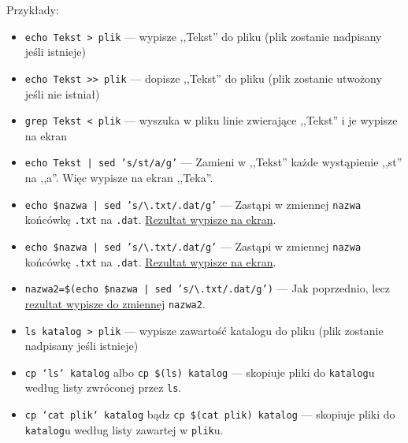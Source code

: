 \documentclass[polish]{instrukcja}
\begin{document}
Przykłady:
\begin{itemize}
\item {\tt echo Tekst {\blue > plik}} --- wypisze ,,Tekst'' do {\blue plik}u ({\blue plik} zostanie nadpisany jeśli istnieje)
\item {\tt echo Tekst {\blue >> plik}} --- dopisze ,,Tekst'' do {\blue plik}u ({\blue plik} zostanie utwożony jeśli nie istniał)
\item {\tt grep Tekst {\blue < plik}} --- wyszuka w {\blue plik}u linie zwierające {\green ,,Tekst''} i je wypisze na ekran
\item {\tt echo Tekst {\blue |} sed 's/st/a/g'} --- Zamieni w ,,Tekst'' każde wystąpienie ,,st'' na ,,a''. Więc wypisze na ekran ,,Teka''.
\item {\tt echo \$nazwa {\blue |} sed 's/\textbackslash{}.txt/.dat/g'} --- Zastąpi w zmiennej {\tt nazwa} końcówkę {\tt .txt} na {\tt .dat}. \uline{Rezultat wypisze na ekran}.
\item {\tt echo \$nazwa {\blue |} sed 's/\textbackslash{}.txt/.dat/g'} --- Zastąpi w zmiennej {\tt nazwa} końcówkę {\tt .txt} na {\tt .dat}. \uline{Rezultat wypisze na ekran}.
\item {\tt nazwa2={\blue \$(}echo \$nazwa {\blue |} sed 's/\textbackslash{}.txt/.dat/g'{\blue )}} --- Jak poprzednio, lecz \uline{rezultat wypisze do zmiennej} {\tt nazwa2}.
\item {\tt ls katalog {\blue > plik}} --- wypisze zawartość {\green katalog}u do {\blue plik}u ({\blue plik} zostanie nadpisany jeśli istnieje)
\item {\tt cp {\blue `}ls{\blue `} katalog} albo {\tt cp {\blue \$(}ls{\blue )} katalog} --- skopiuje pliki do {\tt katalog}u według listy zwróconej przez {\tt ls}.
\item {\tt cp {\blue `}cat plik{\blue `} katalog} bądz {\tt cp {\blue \$(}cat plik{\blue )} katalog} --- skopiuje pliki do {\tt katalog}u według listy zawartej w {\tt plik}u.
\end{itemize}
\end{document}
